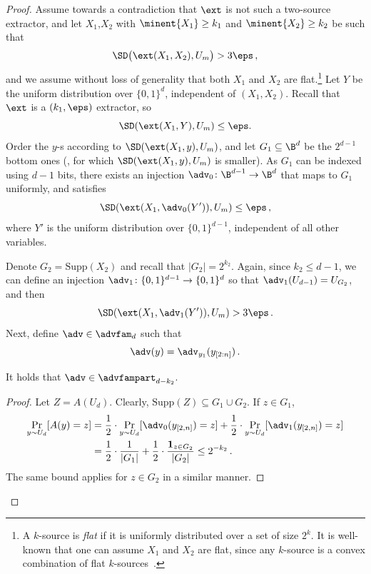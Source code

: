 \begin{proof}
 Assume towards a contradiction that $\ext$ is not such a two-source extractor, and let $X_1$,$ X_2$ with  $\minent{X_1} \geq k_1$ and $\minent{X_2} \geq k_2$ be such that 
	\[
	\SD\big(\ext(X_1,X_2), U_m \big) > 3\eps\,,
	\]
and we assume without loss of generality that both $X_1$ and $X_2$
are flat.\footnote{A $k$-source is \emph{flat} if it is uniformly distributed over a set of size $2^k$. It is well-known that one can assume $X_1$ and $X_2$ are flat, since any $k$-source is a convex combination of flat $k$-sources~\cite{CG88}.}
	Let $Y$ be the uniform distribution over $\{0,1\}^d$, independent of $(X_1, X_2)$.
	Recall that $\ext$ is a $(k_1, \eps)$ extractor, so 
	\[
	\SD(\ext(X_1,Y) ,U_m) \le \eps.
	\]
Order the $y$-s according to $\SD(\ext(X_1,y),U_m)$, and let $G_1 \subseteq \B^d$
be the $2^{d-1}$ bottom ones (\ie, for which $\SD(\ext(X_1,y),U_m)$ is smaller).
As $G_1$ can be indexed using $d-1$ bits, there exists an injection
$\adv_0 \colon \B^{d-1} \rightarrow \B^{d}$ that maps to $G_1$ uniformly, and satisfies
		\begin{equation}\label{eq:1}
	\SD(\ext(X_1,\adv_0(Y')),U_m) \leq \eps\,,
	\end{equation}
	where $Y'$ is the uniform distribution over $\{0,1\}^{d-1}$, independent of
	all other variables.

Denote $G_2 = \mathrm{Supp}(X_2)$ and recall that $|G_2| = 2^{k_2}$.
Again, since $k_2 \leq d -1$, we can define an injection $\adv_1 \colon \{0,1\}^{d-1} \rightarrow \{0,1\}^d$
so that $\adv_1(U_{d-1}) = U_{G_2}$, and then
	\begin{equation}\label{eq:2}
	\SD(\ext(X_1,\adv_1(Y')),U_m) > 3\eps\,.
	\end{equation}
Next, define $\adv \in \advfam_d$ such that \[\adv(y) = \adv_{y_1}(y_{[2:n]})\,.\]
\begin{claim}
It holds that $\adv\in \advfampart_{d-k_2}$.
\end{claim}
\begin{proof}
Let $Z = A(U_d)$. Clearly, $\mathrm{Supp}(Z) \subseteq G_1 \cup G_2$.
If $z \in G_1$,
\begin{align*}
\Pr_{y \sim U_d}[A(y) = z] &= \frac{1}{2} \cdot \Pr_{y \sim U_d}[\adv_0(y_{[2,n]})  = z]
+ \frac{1}{2} \cdot \Pr_{y \sim U_d}[\adv_1(y_{[2,n]})  = z] \\
&= \frac{1}{2} \cdot \frac{1}{|G_1|} + \frac{1}{2} \cdot \frac{\mathbf{1}_{z \in G_2}}{|G_2|}
\le 2^{-k_2}\,.
\end{align*}
The same bound applies for $z \in G_2$ in a similar manner.
\end{proof}



\end{proof}
